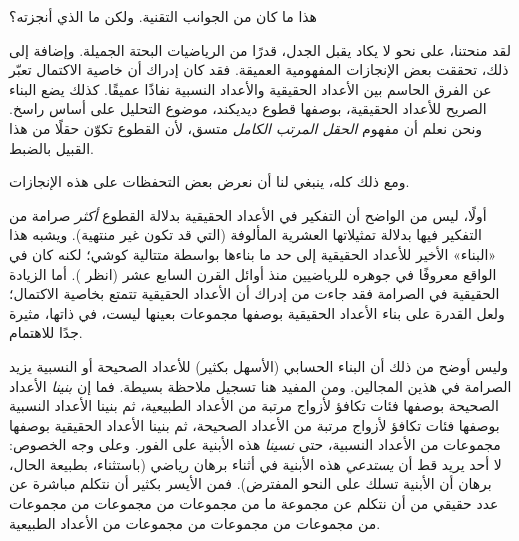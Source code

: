 \documentclass[../../../include/open-logic-section]{subfiles}
\begin{document}

هذا ما كان من الجوانب التقنية. ولكن ما الذي أنجزته؟

لقد منحتنا، على نحو لا يكاد يقبل الجدل، قدرًا من الرياضيات البحتة
{الجميلة}. وإضافة إلى ذلك، تحققت بعض الإنجازات المفهومية العميقة. فقد
كان إدراك أن خاصية الاكتمال تعبّر عن الفرق الحاسم بين الأعداد الحقيقية
والأعداد النسبية نفاذًا عميقًا. كذلك يضع البناء الصريح للأعداد الحقيقية،
بوصفها قطوع ديديكند، موضوع التحليل على أساس راسخ. ونحن نعلم أن مفهوم
\emph{الحقل المرتب الكامل} متسق، لأن القطوع تكوّن حقلًا من هذا القبيل
بالضبط.

ومع ذلك كله، ينبغي لنا أن نعرض بعض التحفظات على هذه الإنجازات.

أولًا، ليس من الواضح أن التفكير في الأعداد الحقيقية بدلالة القطوع
\emph{أكثر} صرامة من التفكير فيها بدلالة تمثيلاتها العشرية المألوفة
(التي قد تكون غير منتهية). ويشبه هذا «البناء» الأخير للأعداد الحقيقية
إلى حد ما بناءها بواسطة متتالية كوشي؛ لكنه كان في الواقع معروفًا في
جوهره للرياضيين منذ أوائل القرن السابع عشر (انظر
). أما الزيادة الحقيقية في الصرامة فقد جاءت من
إدراك أن الأعداد الحقيقية تتمتع بخاصية الاكتمال؛ ولعل القدرة على بناء
الأعداد الحقيقية بوصفها مجموعات بعينها ليست، في ذاتها، مثيرة جدًا
للاهتمام.

وليس أوضح من ذلك أن البناء الحسابي (الأسهل بكثير) للأعداد الصحيحة أو
النسبية يزيد الصرامة في هذين المجالين. ومن المفيد هنا تسجيل ملاحظة
بسيطة. فما إن \emph{بنينا} الأعداد الصحيحة بوصفها فئات تكافؤ لأزواج
مرتبة من الأعداد الطبيعية، ثم بنينا الأعداد النسبية بوصفها فئات تكافؤ
لأزواج مرتبة من الأعداد الصحيحة، ثم بنينا الأعداد الحقيقية بوصفها
مجموعات من الأعداد النسبية، حتى \emph{نسينا} هذه الأبنية على الفور.
وعلى وجه الخصوص: لا أحد يريد قط أن \emph{يستدعي} هذه الأبنية في أثناء
برهان رياضي (باستثناء، بطبيعة الحال، برهان أن الأبنية تسلك على النحو
المفترض). فمن الأيسر بكثير أن نتكلم مباشرة عن عدد حقيقي من أن نتكلم عن
مجموعة ما من مجموعات من مجموعات من مجموعات من مجموعات من مجموعات من
مجموعات من الأعداد الطبيعية.
%
%
%
	
\end{document}
